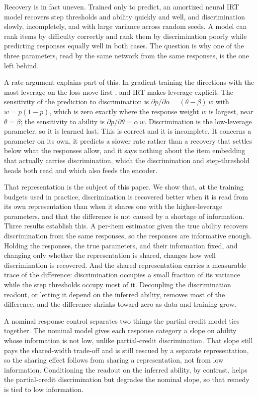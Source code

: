 \documentclass[twocolumn,10pt]{article}
\begin{document}
Recovery is in fact uneven. Trained only to predict, an amortized neural IRT model
recovers step thresholds and ability quickly and well, and discrimination slowly,
incompletely, and with large variance across random seeds. A model can rank items by
difficulty correctly and rank them by discrimination poorly while predicting responses
equally well in both cases. The question is why one of the three parameters, read by the
same network from the same responses, is the one left behind.

A rate argument explains part of this. In gradient training the directions with the most
leverage on the loss move first \citep{saxe2014,rahaman2019}, and IRT makes leverage
explicit. The sensitivity of the prediction to discrimination is $\partial p/\partial\alpha
= (\theta-\beta)\,w$ with $w=p(1-p)$, which is zero exactly where the response weight $w$
is largest, near $\theta=\beta$; the sensitivity to ability is $\partial p/\partial\theta =
\alpha\,w$. Discrimination is the low-leverage parameter, so it is learned last. This is
correct and it is incomplete. It concerns a parameter on its own, it predicts a slower
rate rather than a recovery that settles below what the responses allow, and it says
nothing about the item embedding that actually carries discrimination, which the discrimination and
step-threshold heads both read and which also feeds the encoder.

That representation is the subject of this paper. We show that, at the training budgets
used in practice, discrimination is recovered better when it is read from its own
representation than when it shares one with the higher-leverage parameters, and that the
difference is not caused by a shortage of information. Three results establish this. A
per-item estimator given the true ability recovers discrimination from the same responses,
so the responses are informative enough. Holding the responses, the true parameters, and
their information fixed, and changing only whether the representation is shared, changes
how well discrimination is recovered. And the shared representation carries a measurable
trace of the difference: discrimination occupies a small fraction of its variance while
the step thresholds occupy most of it. Decoupling the discrimination readout, or letting
it depend on the inferred ability, removes most of the difference, and the difference
shrinks toward zero as data and training grow.

A nominal response control separates two things the partial credit model ties together.
The nominal model gives each response category a slope on ability whose information is not
low, unlike partial-credit discrimination. That slope still pays the shared-width trade-off
and is still rescued by a separate representation, so the sharing effect follows from
sharing a representation, not from low information. Conditioning the readout on the inferred
ability, by contrast, helps the partial-credit discrimination but degrades the nominal
slope, so that remedy is tied to low information.
\end{document}
